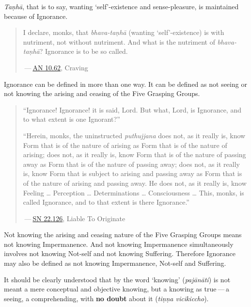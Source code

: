 \emph{Taṇhā}, that is to say, wanting `self'-existence and sense-pleasure, is maintained because of Ignorance.

\begin{quote}
I declare, monks, that \emph{bhava-taṇhā} (wanting `self'-existence) is with nutriment, not without nutriment. And what is the nutriment of \emph{bhava-taṇhā}? Ignorance is to be so called.

 --- \href{https://suttacentral.net/an10.62/en/bodhi}{AN 10.62}, Craving
\end{quote}

Ignorance can be defined in more than one way. It can be defined as not seeing or not knowing the arising and ceasing of the Five Grasping Groups.

\begin{quote}
``Ignorance! Ignorance! it is said, Lord. But what, Lord, is Ignorance, and to what extent is one Ignorant?''

``Herein, monks, the uninstructed \emph{puthujjana} does not, as it really is, know Form that is of the nature of arising as Form that is of the nature of arising; does not, as it really is, know Form that is of the nature of passing away as Form that is of the nature of passing away; does not, as it really is, know Form that is subject to arising and passing away as Form that is of the nature of arising and passing away. He does not, as it really is, know Feeling \ldots\hspace{0pt} Perception \ldots\hspace{0pt} Determinations \ldots\hspace{0pt} Consciousness \ldots\hspace{0pt} This, monks, is called Ignorance, and to that extent is there Ignorance.''

 --- \href{https://suttacentral.net/sn22.126/en/sujato}{SN 22.126}, Liable To Originate
\end{quote}

Not knowing the arising and ceasing nature of the Five Grasping Groups means not knowing Impermanence. And not knowing Impermanence simultaneously involves not knowing Not-self and not knowing Suffering. Therefore Ignorance may also be defined as not knowing Impermanence, Not-self and Suffering.

It should be clearly understood that by the word `knowing' (\emph{pajānāti}) is not meant a mere conceptual and objective knowing, but a knowing as true --- a seeing, a comprehending, with \textbf{no doubt} about it (\emph{tiṇṇa vicikiccho}).

